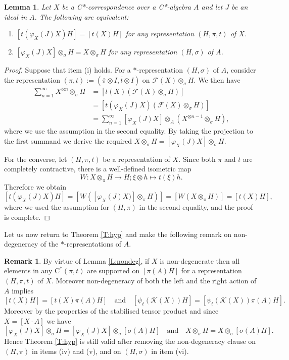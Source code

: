 \documentclass[11pt, draft]{amsart}
\numberwithin{equation}{section}
\theoremstyle{plain}
\newtheorem{lemma}[theorem]{Lemma}
\theoremstyle{definition}
\newtheorem{remark}[theorem]{Remark}
\theoremstyle{remark}
\newcommand{\F}{{\mathcal{F}}}
\newcommand{\K}{{\mathcal{K}}}
\def\si{\sigma}
\newcommand\vphi{\varphi}
\newcommand{\qand}{\quad\text{and}\quad}
\newcommand{\ca}{\mathrm{C}^*}
\newcommand{\ol}{\overline}
\begin{document}
\begin{lemma} \label{L:equi conv}
Let $X$ be a C*-correspondence over a C*-algebra $A$ and let $J$ be an ideal in $A$.
The following are equivalent:
\begin{enumerate}
\item $[t(\vphi_X(J)X)H] = [t(X)H]$ for any representation $(H,\pi,t)$ of $X$.
\item $[\vphi_X(J)X] \otimes_\si H = X \otimes_\si H$ for any representation $(H,\si)$ of $A$.
\end{enumerate}
\end{lemma}

\begin{proof}
Suppose that item (i) holds. 
For a $*$-representation $(H,\si)$ of $A$, consider the representation $(\pi,t) := (\ol{\pi} \otimes I, \ol{t} \otimes I)$ on $\F(X) \otimes_\si H$. 
We then have
\begin{align*}
\sum_{n = 1}^\infty X^{\otimes n} \otimes_\si H
& =
[t(X) (\F(X) \otimes_\si H)] \\
& = 
[t(\vphi_X(J) X) (\F(X) \otimes_\si H)] \\
& =
\sum_{n = 1}^\infty [\vphi_X(J)X] \otimes_A (X^{\otimes n-1} \otimes_\si H),
\end{align*}
where we use the assumption in the second equality.
By taking the projection to the first summand we derive the required $X \otimes_\si H = [\vphi_X(J)X] \otimes_\si H$.

For the converse, let $(H, \pi, t)$ be a representation of $X$.
Since both $\pi$ and $t$ are completely contractive, there is a well-defined isometric map
\[
W \colon X \otimes_\pi H \to H; \xi \otimes h \mapsto t(\xi)h.
\] 
Therefore we obtain
\[
[t(\vphi_X(J) X)H] 
= 
[W( [\vphi_X(J)X)] \otimes_\pi H)]
=
[W( X \otimes_\pi H)]
=
[t(X) H],
\]
where we used the assumption for $(H,\pi)$ in the second equality, and the proof is complete.
\end{proof}

Let us now return to Theorem \ref{T:hyp} and make the following remark on non-degeneracy of the $*$-representations of $A$.

\begin{remark} \label{R:remnd}
By virtue of Lemma \ref{L:nondeg}, if $X$ is non-degenerate then all elements in any $\ca(\pi,t)$ are supported on $[\pi(A)H]$ for a representation $(H,\pi,t)$ of $X$.
Moreover non-degeneracy of both the left and the right action of $A$ implies
\[
[t(X)H] = [t(X) \pi(A) H]
\qand
[\psi_t(\K(X))H] = [\psi_t(\K(X)) \pi(A) H].
\]
Moreover by the properties of the stabilised tensor product and since $X = [X \cdot A]$ we have
\[
[\vphi_X(J)X] \otimes_\si H = [\vphi_X(J)X] \otimes_\si [\si(A)H]
\qand
X \otimes_\si H = X \otimes_\si [\si(A)H].
\]
Hence Theorem \ref{T:hyp} is still valid after removing the non-degeneracy clause on $(H,\pi)$ in items (iv) and (v), and on $(H,\si)$ in item (vi).
\end{remark}
\end{document}
